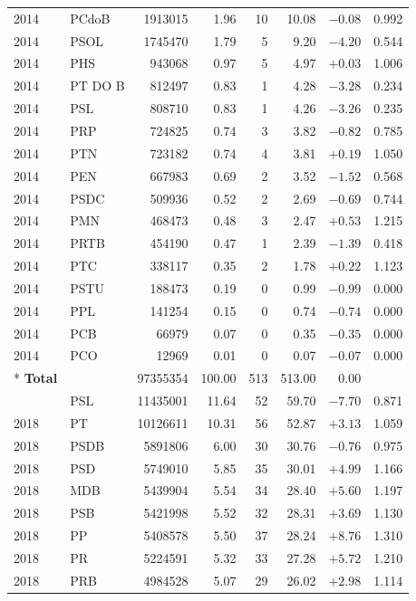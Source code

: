 \begin{longtable}{@{}llrrrrrr@{}}
2014 & PCdoB & 1913015 & 1.96 & 10 & 10.08 & \(-0.08\) & 0.992 \\
2014 & PSOL & 1745470 & 1.79 & 5 & 9.20 & \(-4.20\) & 0.544 \\
2014 & PHS & 943068 & 0.97 & 5 & 4.97 & \(+0.03\) & 1.006 \\
2014 & PT DO B & 812497 & 0.83 & 1 & 4.28 & \(-3.28\) & 0.234 \\
2014 & PSL & 808710 & 0.83 & 1 & 4.26 & \(-3.26\) & 0.235 \\
2014 & PRP & 724825 & 0.74 & 3 & 3.82 & \(-0.82\) & 0.785 \\
2014 & PTN & 723182 & 0.74 & 4 & 3.81 & \(+0.19\) & 1.050 \\
2014 & PEN & 667983 & 0.69 & 2 & 3.52 & \(-1.52\) & 0.568 \\
2014 & PSDC & 509936 & 0.52 & 2 & 2.69 & \(-0.69\) & 0.744 \\
2014 & PMN & 468473 & 0.48 & 3 & 2.47 & \(+0.53\) & 1.215 \\
2014 & PRTB & 454190 & 0.47 & 1 & 2.39 & \(-1.39\) & 0.418 \\
2014 & PTC & 338117 & 0.35 & 2 & 1.78 & \(+0.22\) & 1.123 \\
2014 & PSTU & 188473 & 0.19 & 0 & 0.99 & \(-0.99\) & 0.000 \\
2014 & PPL & 141254 & 0.15 & 0 & 0.74 & \(-0.74\) & 0.000 \\
2014 & PCB & 66979 & 0.07 & 0 & 0.35 & \(-0.35\) & 0.000 \\
2014 & PCO & 12969 & 0.01 & 0 & 0.07 & \(-0.07\) & 0.000 \\*
\midrule
\textbf{Total} &  & 97355354 & 100.00 & 513 & 513.00 & 0.00 &  \\
\addlinespace
2018 & PSL & 11435001 & 11.64 & 52 & 59.70 & \(-7.70\) & 0.871 \\
2018 & PT & 10126611 & 10.31 & 56 & 52.87 & \(+3.13\) & 1.059 \\
2018 & PSDB & 5891806 & 6.00 & 30 & 30.76 & \(-0.76\) & 0.975 \\
2018 & PSD & 5749010 & 5.85 & 35 & 30.01 & \(+4.99\) & 1.166 \\
2018 & MDB & 5439904 & 5.54 & 34 & 28.40 & \(+5.60\) & 1.197 \\
2018 & PSB & 5421998 & 5.52 & 32 & 28.31 & \(+3.69\) & 1.130 \\
2018 & PP & 5408578 & 5.50 & 37 & 28.24 & \(+8.76\) & 1.310 \\
2018 & PR & 5224591 & 5.32 & 33 & 27.28 & \(+5.72\) & 1.210 \\
2018 & PRB & 4984528 & 5.07 & 29 & 26.02 & \(+2.98\) & 1.114 \\

\end{longtable}
